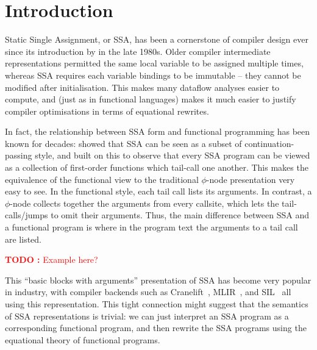 \documentclass[acmsmall,screen,review]{acmart}
\newcounter{todos}
\newcommand{\TODO}[1]{{
  \stepcounter{todos}
  \begin{center}\large{\textcolor{red}{\textbf{TODO \arabic{todos}:} #1}}\end{center}
}}
\begin{document}



\maketitle


\section{Introduction}

Static Single Assignment, or SSA, has been a cornerstone of compiler
design ever since its introduction by \cite{ssa-original} in the late
1980s. Older compiler intermediate representations permitted the same
local variable to be assigned multiple times, whereas SSA requires
each variable bindings to be immutable -- they cannot be modified
after initialisation. This makes many dataflow analyses easier to
compute, and (just as in functional languages) makes it much easier to
justify compiler optimisations in terms of equational rewrites.

In fact, the relationship between SSA form and functional programming
has been known for decades: \citet{kelsey-ssa-cps} showed that SSA can
be seen as a subset of continuation-passing style, and
\citet{appel-ssa} built on this to observe that every SSA program can
be viewed as a collection of first-order functions which tail-call one
another. This makes the equivalence of the functional view to the
traditional $\phi$-node presentation very easy to see. In the
functional style, each tail call lists its arguments. In contrast, a
$\phi$-node collects together the arguments from every callsite, which
lets the tail-calls/jumps to omit their arguments. Thus, the main
difference between SSA and a functional program is where in the
program text the arguments to a tail call are listed.

\TODO{Example here?}

This ``basic blocks with arguments'' presentation of SSA has become
very popular in industry, with compiler backends such as
Cranelift~\cite{cranelift}, MLIR~\cite{mlir}, and SIL~\cite{SIL} all
using this representation. This tight connection might suggest that
the semantics of SSA representations is trivial: we can just interpret
an SSA program as a corresponding functional program, and then rewrite
the SSA programs using the equational theory of functional programs.
\end{document}
